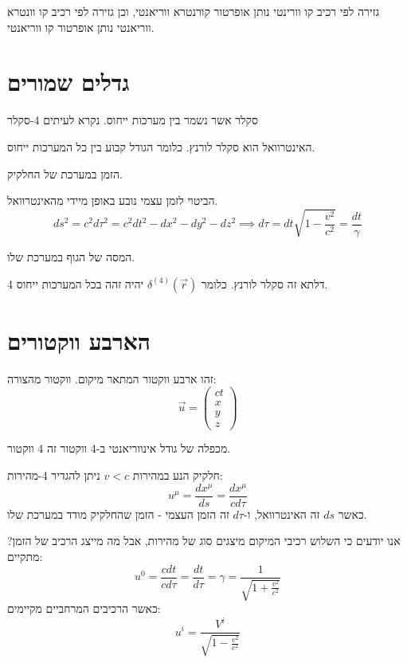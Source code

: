 \documentclass{tstextbook}
\begin{document}
\begin{proposition}
גזירה לפי רכיב קו וורינטי נותן אופרטור קורנטרא ווריאנטי, וכן גזירה לפי רכיב קו וונטרא ווריאנטי נותן אופרטור קו ווריאנטי. 

\end{proposition}
\section{גדלים שמורים}

\begin{definition}
סקלר אשר נשמר בין מערכות ייחוס. נקרא לעיתים 4-סקלר

\end{definition}
\begin{proposition}
האינטרוואל הוא סקלר לורנץ. כלומר הגודל קבוע בין כל המערכות ייחוס.

\end{proposition}
\begin{definition}
הזמן במערכת של החלקיק.

\end{definition}
הביטוי לזמן עצמי נובע באופן מיידי מהאינטרוואל. 
$$ds^2 =c^2d\tau^2=c^2dt^2-dx^2-dy^2-dz^2\implies d\tau=dt\sqrt{ 1-\frac{v^2}{c^2} }=\frac{dt}{\gamma}$$

\begin{definition}
המסה של הגוף במערכת שלו.

\end{definition}
\begin{proposition}
4 דלתא זה סקלר לורנץ. כלומר \(\delta^{(4)}\left( \vec{r} \right)\) יהיה זהה בכל המערכות ייחוס. 

\end{proposition}
\section{הארבע ווקטורים}

\begin{definition}[אירוע]
זהו ארבע ווקטור המתאר מיקום. ווקטור מהצורה:
$$\vec{u}=\begin{pmatrix}ct \\x \\y \\z
\end{pmatrix}$$

\end{definition}
\begin{proposition}
מכפלה של גודל אינווריאנטי ב-4 ווקטור זה 4 ווקטור.

\end{proposition}
\begin{definition}[4 מהירות]
חלקיק הנע במהירות \(v<c\) ניתן להגדיר 4-מהירות:
$$u^\mu = \frac{dx^\mu}{ds}=\frac{dx^\mu}{cd\tau} $$
כאשר \(ds\) זה האינטרוואל, ו-\(d\tau\) זה הזמן העצמי - הזמן שהחלקיק מודד במערכת שלו. 

\end{definition}
אנו יודעים כי השלוש רכיבי המיקום מיצגים סוג של מהירות, אבל מה מייצג הרכיב של הזמן?
מתקיים:
$$u^0=\frac{cdt}{cd\tau}=\frac{dt}{d\tau}=\gamma=\frac{1}{\sqrt{ 1+\frac{v^2}{c^2} }}$$
כאשר הרכיבים המרחביים מקיימים:
$$u^i=\frac{V^i}{\sqrt{ 1-\frac{v^2}{c^2} }}$$
\end{document}
